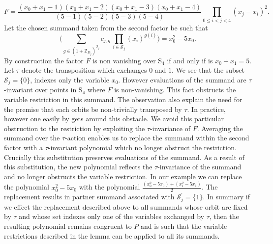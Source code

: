 \[
F=\frac{(x_{0}+x_{1}-1)(x_{0}+x_{1}-2)(x_{0}+x_{1}-3)(x_{0}+x_{1}-4)}{\left(5-1\right)\left(5-2\right)\left(5-3\right)\left(5-4\right)}\prod_{0\leq i<j<4}(x_{j}-x_{i})^{2}.
\]
Let the chosen summand taken from the second factor be such that
\[
\bigg(\sum_{g\in(1+\mathbb{Z}_{D_{j}})^{\mathscr{S}_{j}}}c_{j,g}\,\prod_{i\in\mathscr{S}_{j}}(x_{i})^{g(i)} \bigg)=x_{0}^{2}-5x_{0}.
\]
By construction the factor $F$ is non vanishing over $\text{S}_4$ if and only if  is $x_0+x_1=5$. Let $\tau$ denote the transposition which exchanges $0$ and $1$. We see that the subset $\mathscr{S}_j=\{0\}$, indexes only the variable $x_0$. However evaluations of the summand are $\tau$-invariant over points in $\text{S}_4$ where $F$ is non-vanishing. This fact obstructs the variable restriction in this summand. The observation also explain the need for the premise that each orbits be non-trivially transposed by $\tau$. In practice, however one easily by gets around this obstacle. We avoid this particular obstruction to the restriction by exploiting the $\tau$-invariance of $F$. Averaging the summand over the $\tau$-action enables us to replace the summand within the second factor with a $\tau$-invariant polynomial which no longer obstruct the restriction. Crucially this substitution preserves evaluations of the summand. As a result of this substitution, the new polynomial reflects the $\tau$-invariance of the summand and no longer obstructs the variable restriction. In our example we can replace the polynomial $x_{0}^{2}-5x_{0}$ with the polynomial $\frac{(x_{0}^{2}-5x_{0})+(x_{1}^{2}-5x_{1})}{2}$. The replacement results in partner summand associated with $\mathscr{S}_{j}^\prime=\{1\}$. In summary if we effect the replacement described above to all summands whose orbit are fixed by $\tau$ and whose set indexes only one of the variables exchanged by $\tau$, then the resulting polynomial remains congruent to $P$ and is such that the variable restrictions described in the lemma can be applied to all its summands.

